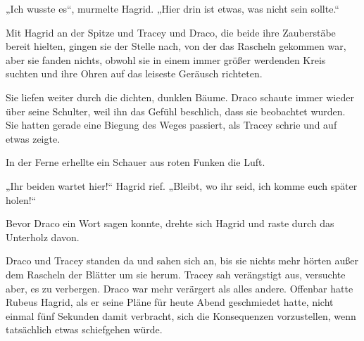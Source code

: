 „Ich wusste es“, murmelte Hagrid.
„Hier drin ist etwas, was nicht sein sollte.“

Mit Hagrid an der Spitze und Tracey und Draco, die beide ihre Zauberstäbe bereit hielten, gingen sie der Stelle nach, von der das Rascheln gekommen war, aber sie fanden nichts, obwohl sie in einem immer größer werdenden Kreis suchten und ihre Ohren auf das leiseste Geräusch richteten.

Sie liefen weiter durch die dichten, dunklen Bäume. Draco schaute immer wieder über seine Schulter, weil ihn das Gefühl beschlich, dass sie beobachtet wurden. Sie hatten gerade eine Biegung des Weges passiert, als Tracey schrie und auf etwas zeigte.

In der Ferne erhellte ein Schauer aus roten Funken die Luft.

„Ihr beiden wartet hier!“ Hagrid rief.
„Bleibt, wo ihr seid, ich komme euch später holen!“

Bevor Draco ein Wort sagen konnte, drehte sich Hagrid und raste durch das Unterholz davon.

Draco und Tracey standen da und sahen sich an, bis sie nichts mehr hörten außer dem Rascheln der Blätter um sie herum. Tracey sah verängstigt aus, versuchte aber, es zu verbergen. Draco war mehr verärgert als alles andere. Offenbar hatte Rubeus Hagrid, als er seine Pläne für heute Abend geschmiedet hatte, nicht einmal fünf Sekunden damit verbracht, sich die Konsequenzen vorzustellen, wenn tatsächlich etwas schiefgehen würde.

